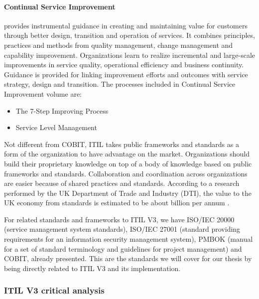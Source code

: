 \paragraph{\textbf{Continual Service Improvement}} provides instrumental guidance in creating and maintaining value for customers through better design, transition and operation of services. It combines principles, practices and methods from quality management, change management and capability improvement. Organizations learn to realize incremental and large-scale improvements in service quality, operational efficiency and business continuity. Guidance is provided for linking improvement efforts and outcomes with service strategy, design and transition.\cite{itilST} The processes included in Continual Service Improvement volume are:

\begin{itemize}
  \item The 7-Step Improving Process
  \item Service Level Management
\end{itemize} 

\par Not different from COBIT,  ITIL takes public frameworks and standards as a form of the organization to have advantage on the market. Organizations should build their proprietary knowledge on top of a body of knowledge based on public frameworks and standards. Collaboration and coordination across organizations are easier because of shared practices and standards. According to a research performed by the UK Department of Trade and Industry (DTI), the value to the UK economy from standards is estimated to be about  billion per annum \cite{McNeillis01112005}.\par
For related standards and frameworks to ITIL V3, we have ISO/IEC 20000 (service management system standards), ISO/IEC 27001 (standard providing requirements for an information security management system), PMBOK (manual for a set of standard terminology and guidelines for project management)\cite{pmbok5} and COBIT\cite{2012cobit}, already presented. This are the standards we will cover for our thesis by being directly related to ITIL V3 and its implementation.


\subsubsection{ITIL V3 critical analysis}


